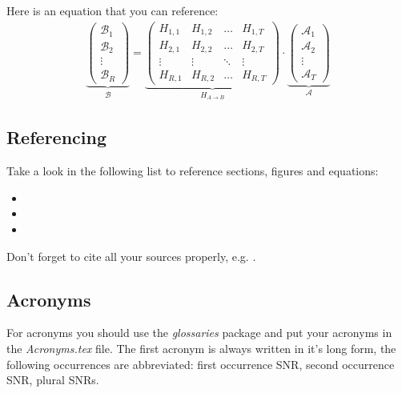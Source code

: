 Here is an equation that you can reference:
\begin{align}
	\underbrace{
		\begin{pmatrix}
			\mathcal{B}_1 \\
			\mathcal{B}_2 \\
			\vdots        \\
			\mathcal{B}_R
		\end{pmatrix}
	}_{\mathcal{B}}
	= \underbrace{
		\begin{pmatrix}
			H_{1,1} & H_{1,2} & \hdots & H_{1,T} \\
			H_{2,1} & H_{2,2} & \hdots & H_{2,T} \\
			\vdots  & \vdots  & \ddots & \vdots  \\
			H_{R,1} & H_{R,2} & \hdots & H_{R,T}
		\end{pmatrix}
	}_{H_{A\rightarrow B}}
	\cdot \underbrace{
		\begin{pmatrix}
			\mathcal{A}_1 \\
			\mathcal{A}_2 \\
			\vdots        \\
			\mathcal{A}_T
		\end{pmatrix}
	}_{\mathcal{A}}
	\label{eqn:example}
\end{align}

\subsection{Referencing}

Take a look in the following list to reference sections, figures and equations:
\begin{itemize}
  \item {}
  \item {}
  \item {}
\end{itemize}

Don't forget to cite all your sources properly, e.g. \cite{1975:Wyner}.

\subsection{Acronyms}
For acronyms you should use the \emph{glossaries} package and put your acronyms
in the \emph{Acronyms.tex} file. The first acronym is always
written in it's long form, the following occurrences are abbreviated: first
occurrence \gls{SNR}, second occurrence \gls{SNR}, plural \glspl{SNR}.

